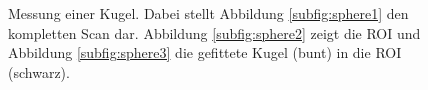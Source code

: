 \documentclass[	12pt,
				a4paper,
				bibliography=totoc,
				listof=totoc,
				index=totoc,
				twoside,
				headsepline,
				footsepline,
				ngerman]{scrartcl}
\begin{document}
\begin{appendix}
		\begin{figure}[h]
			\centering
			\caption[Messung einer Kugel]{Messung einer Kugel. Dabei stellt Abbildung \ref{subfig:sphere1} den kompletten Scan dar. Abbildung \ref{subfig:sphere2} zeigt die ROI und Abbildung \ref{subfig:sphere3} die gefittete Kugel (bunt) in die ROI (schwarz).}
			\label{fig:sphere_fit}
		\end{figure}
\end{appendix}
\cleardoublepage



\listoffigures
\clearpage

\listoftables
\clearpage
\end{document}
